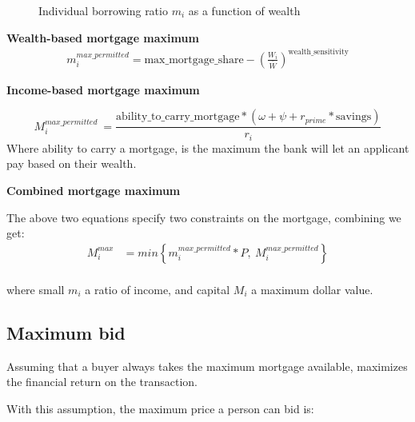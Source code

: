 \begin{figure}
    \centering

    \caption{Individual borrowing ratio $m_i$ as a function of wealth}
    \label{fig:Individual-borrowing-rate}
\end{figure}


\textbf{Wealth-based mortgage maximum} 
\begin{align}
m_i^{max\_permitted} = \mathrm{max\_mortgage\_share} - \left(\frac{W_i}{\bar W}\right)^{\mathrm{wealth\_sensitivity}} \label{eqn-wealth-based-mortgage}    
\end{align} 


\textbf{Income-based mortgage maximum}

\[M^{max\_permitted}_i\ = \frac{\mathrm{ability\_to\_carry\_mortgage}*(\omega+\psi+ r_{prime}* \mathrm{savings})}{r_i}\]
Where ability to carry a mortgage, is the maximum the bank will let an applicant pay based on their wealth.
 
\textbf{Combined mortgage maximum}

The above  two equations specify two constraints on the mortgage,  combining we get:
\begin{align} 
M_i^{max} &= min \left\{ m_i^{max\_permitted}*P, \ M^{max\_permitted}_i \right\} \\
\label{eqn-max-mortgage2}
\end{align}

where small $m_i$ a ratio of income, and capital $M_i$ a maximum dollar value.


\subsection{Maximum bid}

Assuming that a buyer always takes the maximum mortgage available, maximizes the financial return on the transaction. %

With this assumption, the maximum price a person can bid is:

